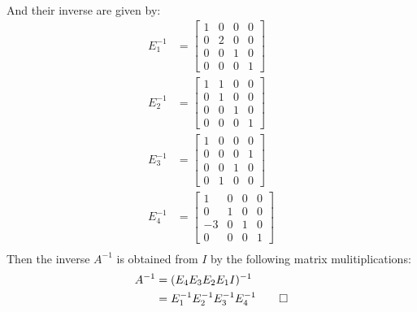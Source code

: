 \documentclass[12pt, a4paper]{article}
\begin{document}
\begin{enumerate}[Q\arabic*.]
\begin{align*}
    \end{align*}
    And their inverse are given by:
    \begin{align*}
      E_1^{-1} &= \begin{bmatrix}1&0&0&0\\0&2&0&0\\0&0&1&0\\0&0&0&1\end{bmatrix} \\
      E_2^{-1} &= \begin{bmatrix}1&1&0&0\\0&1&0&0\\0&0&1&0\\0&0&0&1\end{bmatrix} \\
      E_3^{-1} &= \begin{bmatrix}1&0&0&0\\0&0&0&1\\0&0&1&0\\0&1&0&0\end{bmatrix} \\
      E_4^{-1} &= \begin{bmatrix}1&0&0&0\\0&1&0&0\\-3&0&1&0\\0&0&0&1\end{bmatrix} \\
    \end{align*}
    Then the inverse $A^{-1}$ is obtained from $I$ by the following matrix mulitiplications:
    \begin{align*}
      A^{-1} &= (E_4E_3E_2E_1I)^{-1} \\
             &= E_1^{-1}E_2^{-1}E_3^{-1}E_4^{-1} \qed
    \end{align*}


\end{enumerate}
\end{document}
